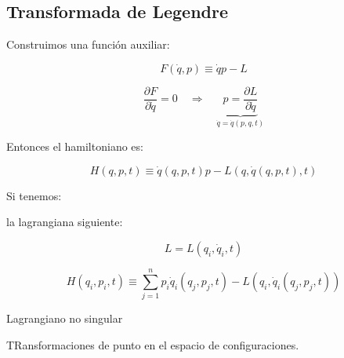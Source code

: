 \documentclass{article}
\begin{document}
\subsection{Transformada de Legendre}


Construimos una función auxiliar:


\[  F(\dot{q},p) \equiv \dot{q}p-L    \]


\[ \frac{ \partial F}{ \partial \dot{q} } =0 \quad \Rightarrow \quad \underbrace{\boxed{ p = \frac{\partial L  }{\partial \dot{q}  }}}_{ \dot{q} = \dot{q}(p,q,t)  }  \]


Entonces el hamiltoniano es:


\[ H(q,p,t) \equiv \dot{q} (q,p,t) p - L(q,\dot{q}(q,p,t),t)   \]


Si tenemos:


la lagrangiana siguiente:


\[ L = L(q_{i},\dot{q}_{i}, t)  \]

\[ H(q_{i}, p_{i}, t) \equiv \sum\limits_{j=1}^{n} p_{i}\dot{q}_{i}(q_{j}, p_{j}, t) - L(q_{i},\dot{q}_{i} (q_{j}, p_{j},t) )\]

Lagrangiano no singular

TRansformaciones de punto en el espacio de configuraciones. 
\end{document}
